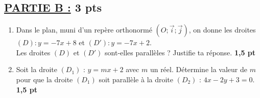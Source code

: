 \documentclass[12pt,a4paper]{article}
\begin{document}
\vspace{0.5cm}

\subsection*{\underline{PARTIE B :} 3 pts}

\begin{enumerate}
    \item Dans le plan, muni d’un repère orthonormé \((O; \vec{i}; \vec{j})\), on donne les droites \\
    \((D) : y = -7x + 8\) et \((D') : y = -7x + 2\).\\
    Les droites \((D)\) et \((D')\) sont-elles parallèles ? Justifie ta réponse. \hfill \textbf{1,5 pt}
    
    \item Soit la droite \((D_1)\) : \(y = mx + 2\) avec \(m\) un réel. Détermine la valeur de \(m\) pour que la droite \((D_1)\) soit parallèle à la droite \((D_2)\) : \(4x - 2y + 3 = 0\). \hfill \textbf{1,5 pt}
\end{enumerate}
\end{document}

